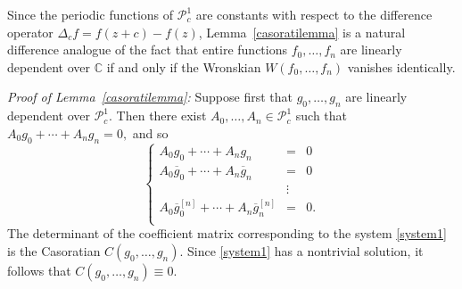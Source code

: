 \documentclass{amsart}
\newcommand{\C}{\mathbb{C}}
\theoremstyle{definition}
\numberwithin{equation}{section}
\numberwithin{theorem}{section}
\begin{document}
Since the periodic functions of $\mathcal{P}^1_c$ are constants with respect to the difference operator $\Delta_c f=f(z+c)-f(z)$, Lemma~\ref{casoratilemma} is a natural difference analogue of the fact that entire functions $f_0,\ldots,f_n$ are linearly dependent over $\C$ if and only if the Wronskian $W(f_0,\ldots,f_n)$ vanishes identically.

\medskip

\noindent\textit{Proof of Lemma~\ref{casoratilemma}: } Suppose first that $g_0,\ldots,g_n$ are linearly dependent over $\mathcal{P}^1_c$. Then there exist $A_0,\ldots,A_n\in\mathcal{P}^1_c$ such that
	$
	A_0g_0+\cdots+A_ng_n=0,
	$
and so
	\begin{equation}\label{system1}
	\left\{\begin{array}{lcl}
	A_0g_0+\cdots+A_ng_n &=&0\\
	A_0\overline{g}_0+\cdots+A_n \overline{g}_n&=&0\\
	&\vdots&\\
	A_0\overline{g}^{[n]}_0+\cdots+A_n \overline{g}^{[n]}_n&=&0.\\
	\end{array}\right.
	\end{equation}
The determinant of the coefficient matrix corresponding to the system \eqref{system1} is the Casoratian $C(g_0,\ldots,g_n)$. Since \eqref{system1} has a nontrivial solution, it follows that $C(g_0,\ldots,g_n)\equiv0$.
\end{document}
